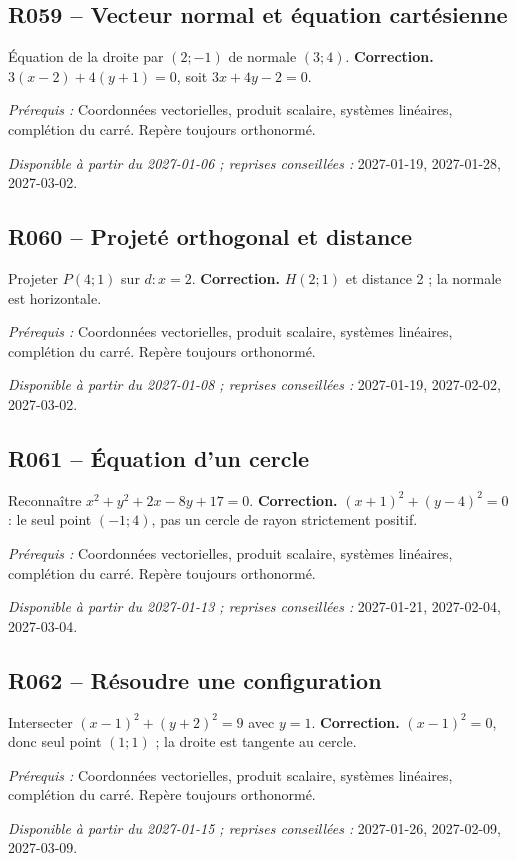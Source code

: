 \subsection*{R059 -- Vecteur normal et équation cartésienne}\label{R059}
Équation de la droite par $(2;-1)$ de normale $(3;4)$.
\ifprof\textbf{Correction.} $3(x-2)+4(y+1)=0$, soit $3x+4y-2=0$.\par\textit{Prérequis :} Coordonnées vectorielles, produit scalaire, systèmes linéaires, complétion du carré. Repère toujours orthonormé.\par\textit{Disponible à partir du 2027-01-06 ; reprises conseillées :} 2027-01-19, 2027-01-28, 2027-03-02.\fi
{}\subsection*{R060 -- Projeté orthogonal et distance}\label{R060}
Projeter $P(4;1)$ sur $d:x=2$.
\ifprof\textbf{Correction.} $H(2;1)$ et distance 2 ; la normale est horizontale.\par\textit{Prérequis :} Coordonnées vectorielles, produit scalaire, systèmes linéaires, complétion du carré. Repère toujours orthonormé.\par\textit{Disponible à partir du 2027-01-08 ; reprises conseillées :} 2027-01-19, 2027-02-02, 2027-03-02.\fi
{}\subsection*{R061 -- Équation d’un cercle}\label{R061}
Reconnaître $x^2+y^2+2x-8y+17=0$.
\ifprof\textbf{Correction.} $(x+1)^2+(y-4)^2=0$ : le seul point $(-1;4)$, pas un cercle de rayon strictement positif.\par\textit{Prérequis :} Coordonnées vectorielles, produit scalaire, systèmes linéaires, complétion du carré. Repère toujours orthonormé.\par\textit{Disponible à partir du 2027-01-13 ; reprises conseillées :} 2027-01-21, 2027-02-04, 2027-03-04.\fi
{}\subsection*{R062 -- Résoudre une configuration}\label{R062}
Intersecter $(x-1)^2+(y+2)^2=9$ avec $y=1$.
\ifprof\textbf{Correction.} $(x-1)^2=0$, donc seul point $(1;1)$ ; la droite est tangente au cercle.\par\textit{Prérequis :} Coordonnées vectorielles, produit scalaire, systèmes linéaires, complétion du carré. Repère toujours orthonormé.\par\textit{Disponible à partir du 2027-01-15 ; reprises conseillées :} 2027-01-26, 2027-02-09, 2027-03-09.\fi
